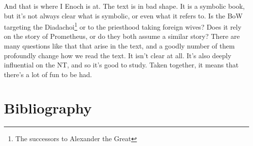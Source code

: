 \documentclass{article}
\begin{document}
And that is where I Enoch is at.
The text is in bad shape.
It is a symbolic book, but it's not always clear what is symbolic, or even what it refers to.
Is the BoW targeting the Diadachoi\footnote{The successors to Alexander the Great} or to the priesthood taking foreign wives?
Does it rely on the story of Prometheus, or do they both assume a similar story?
There are many questions like that that arise in the text, and a goodly number of them profoundly change how we read the text.
It isn't clear at all.
It's also deeply influential on the NT, and so it's good to study.
Taken together, it means that there's a lot of fun to be had.

\section{Bibliography}

\printbibliography
\end{document}
